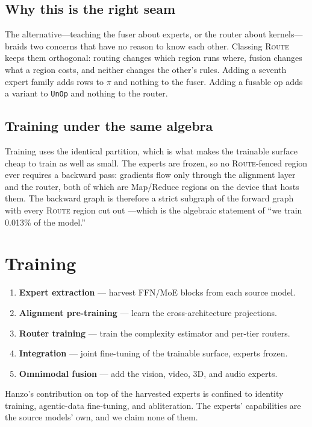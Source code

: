 \documentclass[11pt,a4paper]{article}
\begin{document}
\subsection{Why this is the right seam}

The alternative---teaching the fuser about experts, or the router about kernels---braids
two concerns that have no reason to know each other. Classing \textsc{Route} keeps them
orthogonal: routing changes which region runs where, fusion changes what a region costs,
and neither changes the other's rules. Adding a seventh expert family adds rows to $\pi$
and nothing to the fuser. Adding a fusable op adds a variant to \texttt{UnOp} and nothing
to the router.

\subsection{Training under the same algebra}

Training uses the identical partition, which is what makes the trainable surface cheap to
train as well as small. The experts are frozen, so no \textsc{Route}-fenced region ever
requires a backward pass: gradients flow only through the alignment layer and the router,
both of which are Map/Reduce regions on the device that hosts them. The backward graph is
therefore a strict subgraph of the forward graph with every \textsc{Route} region cut out
---which is the algebraic statement of ``we train 0.013\% of the model.''

\section{Training}

\begin{enumerate}
  \item \textbf{Expert extraction} --- harvest FFN/MoE blocks from each source model.
  \item \textbf{Alignment pre-training} --- learn the cross-architecture projections.
  \item \textbf{Router training} --- train the complexity estimator and per-tier routers.
  \item \textbf{Integration} --- joint fine-tuning of the trainable surface, experts frozen.
  \item \textbf{Omnimodal fusion} --- add the vision, video, 3D, and audio experts.
\end{enumerate}

Hanzo's contribution on top of the harvested experts is confined to identity training,
agentic-data fine-tuning, and abliteration. The experts' capabilities are the source
models' own, and we claim none of them.
\end{document}

